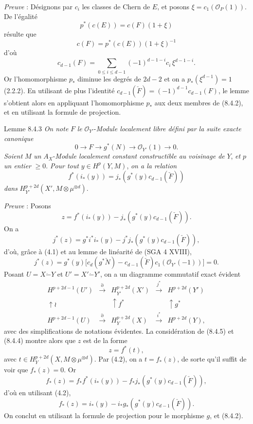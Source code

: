 \emph{Preuve} : Désignons par $c_i$ les classes de Chern de $E$, et posons $\xi=c_1(\mathcal{O}_P(1))$. De l'égalité
\[
p^*(c(E))=c(F)(1+\xi)
\]
résulte que
\[
c(F)=p^*(c(E))(1+\xi)^{-1}
\]
d'où
\[
c_{d-1}(F)=\sum_{0\le i\le d-1}(-1)^{d-1-i}c_i\,\xi^{d-1-i}.
\tag{8.4.2}
\]
Or l'homomorphisme $p_*$ diminue les degrés de $2d-2$ et on a $p_*(\xi^{d-1})=1$ (2.2.2). En utilisant de plus l'identité $c_{d-1}(\check F)=(-1)^{d-1}c_{d-1}(F)$, le lemme s'obtient alors en appliquant l'homomorphisme $p_*$ aux deux membres de (8.4.2), et en utilisant la formule de projection.

\begin{statement}{Lemme 8.4.3}
\emph{On note} $F$ \emph{le} $\mathcal{O}_{Y'}$-\emph{Module localement libre défini par la suite exacte canonique}
\[
0\to F\to g^*(N)\to\mathcal{O}_{Y'}(1)\to0.
\]
\emph{Soient} $M$ \emph{un} $A_X$-\emph{Module localement constant constructible au voisinage de} $Y$, \emph{et} $p$ \emph{un entier} $\ge0$. \emph{Pour tout} $y\in H^p(Y,M)$, \emph{on a la relation}
\[
f^*(i_*(y))=j_*(g^*(y)c_{d-1}(\check F))
\]
\emph{dans} $H_{Y'}^{p+2d}(X',M\otimes\mu^{\otimes d})$.
\end{statement}

\emph{Preuve} : Posons
\[
z=f^*(i_*(y))-j_*(g^*(y)c_{d-1}(\check F)).
\]
On a
\[
j^*(z)=g^*i^*i_*(y)-j^*j_*(g^*(y)c_{d-1}(\check F)),
\]
d'où, grâce à (4.1) et au lemme de linéarité de (SGA 4 XVIII),
\[
j^*(z)=g^*(y)\bigl[c_d(g^*\check N)-c_{d-1}(\check F)c_1(\mathcal{O}_{Y'}(-1))\bigr]=0.
\tag{8.4.4}
\]
Posant $U=X\mathbin{\dot{-}}Y$ et $U'=X'\mathbin{\dot{-}}Y'$, on a un diagramme commutatif exact évident
\[
\begin{array}{ccccc}
H^{p+2d-1}(U')&\xrightarrow{\partial}&H^{p+2d}_{Y'}(X')&\xrightarrow{j^*}&H^{p+2d}(Y')\\
\uparrow\wr&&\uparrow f^*&&\uparrow g^*\\
H^{p+2d-1}(U)&\xrightarrow{\partial}&H_Y^{p+2d}(X)&\xrightarrow{i^*}&H^{p+2d}(Y),
\end{array}
\tag{8.4.5}
\]
avec des simplifications de notations évidentes. La considération de (8.4.5) et (8.4.4) montre alors que $z$ est de la forme
\[
z=f^*(t),
\]
avec $t\in H_Y^{p+2d}(X,M\otimes\mu^{\otimes d})$. Par (4.2), on a $t=f_*(z)$, de sorte qu'il suffit de voir que $f_*(z)=0$. Or
\[
f_*(z)=f_*f^*(i_*(y))-f_*j_*(g^*(y)c_{d-1}(\check F)),
\]
d'où en utilisant (4.2),
\[
f_*(z)=i_*(y)-i_*g_*(g^*(y)c_{d-1}(\check F)).
\]
On conclut en utilisant la formule de projection pour le morphisme $g$, et (8.4.2).

